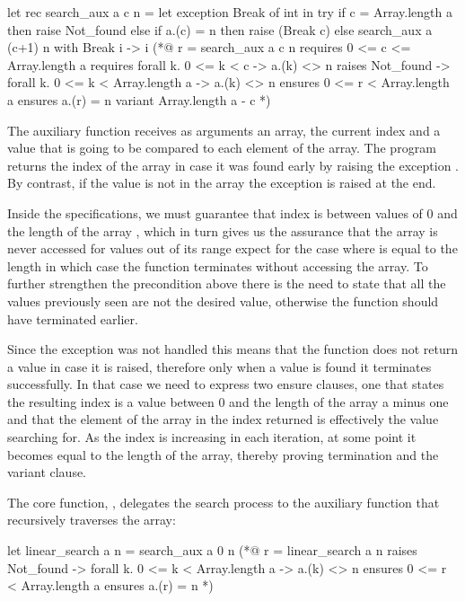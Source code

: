\begin{gospell}
let rec search_aux a c n =
  let exception Break of int in try
    if c = Array.length a then raise Not_found 
    else if a.(c) = n then raise (Break c) 
    else search_aux a (c+1) n
  with Break i -> i
(*@
  r = search_aux a c n
  requires 0 <= c <= Array.length a
  requires forall k. 0 <= k < c -> a.(k) <> n
  raises Not_found -> forall k. 0 <= k < Array.length a -> a.(k) <> n
  ensures 0 <= r < Array.length a
  ensures a.(r) = n
  variant Array.length a - c
*)
\end{gospell}

The auxiliary function  receives as arguments an array, the current index and a value that is going to be 
compared to each element of the array. The program returns the index of the array in case it was found early by raising
the exception . By contrast, if the value is not in the array the exception  is raised at the end.

Inside the \gospel specifications, we must guarantee that index  is between values of 0 and the length of the array 
, which in turn gives us the assurance that the array is never accessed for values out of its range expect for the case 
where  is equal to the length in which case the function terminates without accessing the array. To further strengthen the
precondition above there is the need to state that all the values previously seen are not the desired value, otherwise the function
should have terminated earlier.

Since the exception  was not handled this means that the function does not return a value in case it is raised,
therefore only when a value is found it terminates successfully. In that case we need to express two ensure clauses, one that states 
the resulting index is a value between 0 and the length of the array a minus one and that the element of the array in the index returned 
is effectively the value searching for. As the index is increasing in each iteration, at some point it becomes equal to the length of the 
array, thereby proving termination and the variant clause.

The core function, , delegates the search process to the auxiliary function that recursively traverses 
the array:

\begin{gospell}
let linear_search a n = search_aux a 0 n
(*@
  r = linear_search a n
  raises Not_found -> forall k. 0 <= k < Array.length a -> a.(k) <> n
  ensures 0 <= r < Array.length a
  ensures a.(r) = n
*)
\end{gospell}

